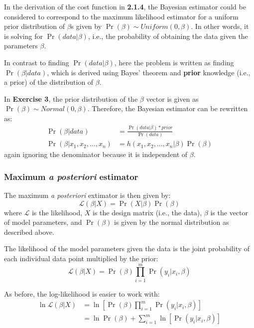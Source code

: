 \documentclass{article}
\begin{document}
	In the derivation of the cost function in \textbf{2.1.4}, the Bayesian estimator could be considered to correspond to the maximum likelihood estimator for a uniform prior distribution of $\beta$s given by $\Pr(\beta)\sim Uniform(0,\beta)$. In other words, it is solving for $\Pr(data|\beta)$, i.e., the probability of obtaining the data given the parameters $\beta$.
	
	In contrast to finding $\Pr(data|\beta)$, here the problem is written as finding $\Pr(\beta|data)$, which is derived using Bayes' theorem and \textbf{prior} knowledge (i.e., a prior) of the distribution of $\beta$.
	
	In \textbf{Exercise 3}, the prior distribution of the $\beta$ vector is given as $\Pr(\beta)\sim Normal(0,\beta)$. Therefore, the Bayesian estimator can be rewritten as:
	\begin{align*}
	\Pr(\beta|data)&=\frac{\Pr(data|\beta)*prior}{\Pr(data)}\\
	\Pr(\beta|x_1, x_2,...,x_n)&=h(x_1, x_2,...,x_n|\beta)\Pr(\beta)
	\end{align*}
	again ignoring the denominator because it is independent of $\beta$.
	
	\subsubsection{Maximum \textit{a posteriori} estimator}
	The maximum \textit{a posteriori} extimator is then given by:
	\begin{equation*}
	\mathcal{L}(\beta|X)=\Pr(X|\beta)\Pr(\beta)
	\end{equation*}
	where $\mathcal{L}$ is the likelihood, $X$ is the design matrix (i.e., the data), $\beta$ is the vector of model parameters, and $\Pr(\beta)$ is given by the normal distribution as described above.
	
	The likelihood of the model parameters given the data is the joint probability of each individual data point multiplied by the prior:
	\begin{equation*}
	\mathcal{L}(\beta|X)=\Pr(\beta)\prod_{i=1}^{m}\Pr(y_i|x_i,\beta)
	\end{equation*}
	
	As before, the log-likelihood is easier to work with:
	\begin{align}
	\ln\mathcal{L}(\beta|X)&=\ln\left[\Pr(\beta)\prod_{i=1}^{m}\Pr(y_i|x_i,\beta)\right]\\
	&=\ln\Pr(\beta)+\sum_{i=1}^{m}\ln\left[\Pr(y_i|x_i,\beta)\right]
	\end{align}
	
\end{document}
